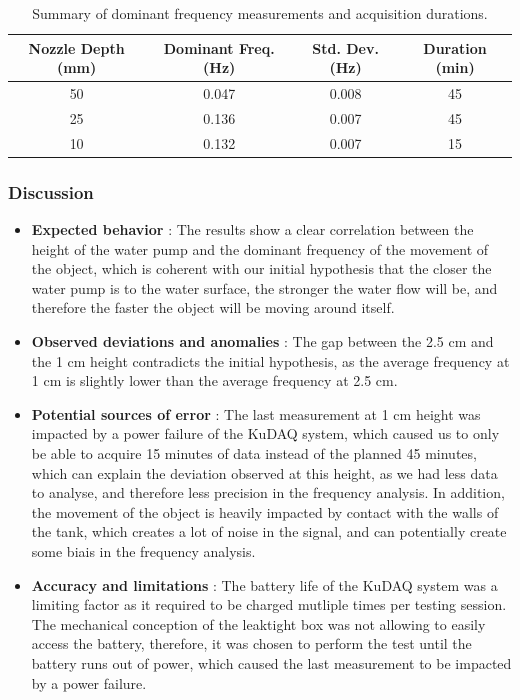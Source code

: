 \documentclass[10pt, a4paper, twocolumn]{article}
\begin{document}
\begin{table}[hbt!]
\centering
\small
{}
\caption{Summary of dominant frequency measurements and acquisition durations.}
\label{tab:frequency_summary}
\begingroup
\color{CatppuccinSubtext1}
\begin{tabular}{@{}cccc@{}}
\toprule
\textcolor{CatppuccinPeach}{\textbf{Nozzle Depth (mm)}} & \textcolor{CatppuccinPeach}{\textbf{Dominant Freq. (Hz)}} & \textcolor{CatppuccinPeach}{\textbf{Std. Dev. (Hz)}} & \textcolor{CatppuccinPeach}{\textbf{Duration (min)}} \\
\midrule
50 & 0.047 & 0.008 & 45 \\
25 & 0.136 & 0.007 & 45 \\
10 & 0.132 & 0.007 & 15 \\
\bottomrule
\end{tabular}
\endgroup
\end{table}




\subsubsection{Discussion}
\begin{itemize}
    \item \textbf{Expected behavior} : The results show a clear correlation between the height of the water pump and the dominant frequency of the movement of the object, which is coherent with our initial hypothesis that the closer the water pump is to the water surface, the stronger the water flow will be, and therefore the faster the object will be moving around itself.
    \item \textbf{Observed deviations and anomalies} : The gap between the 2.5 cm and the 1 cm height contradicts the initial hypothesis, as the average frequency at 1 cm is slightly lower than the average frequency at 2.5 cm.
    \item \textbf{Potential sources of error} : The last measurement at 1 cm height was impacted by a power failure of the KuDAQ system, which caused us to only be able to acquire 15 minutes of data instead of the planned 45 minutes, which can explain the deviation observed at this height, as we had less data to analyse, and therefore less precision in the frequency analysis. In addition, the movement of the object is heavily impacted by contact with the walls of the tank, which creates a lot of noise in the signal, and can potentially create some biais in the frequency analysis.
    \item \textbf{Accuracy and limitations} : The battery life of the KuDAQ system was a limiting factor as it required to be charged mutliple times per testing session. The mechanical conception of the leaktight box was not allowing to easily access the battery, therefore, it was chosen to perform the test until the battery runs out of power, which caused the last measurement to be impacted by a power failure.
\end{itemize}
\end{document}

